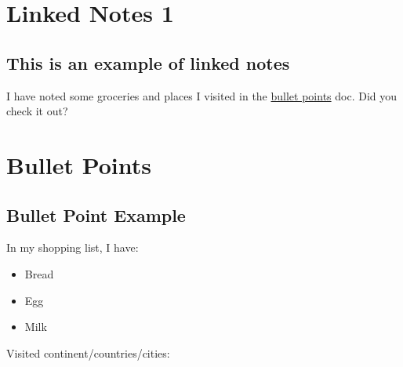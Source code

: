 \documentclass[10pt]{report}
\begin{document}
\tableofcontents


\chapter{Linked Notes 1}\label{ch:Linked Notes 1}

\section{This is an example of linked notes}


I have noted some groceries and places I visited in the \hyperref[ch:Bullet Points]{bullet points} doc. Did you check it out?
\chapter{Bullet Points}\label{ch:Bullet Points}

\section{Bullet Point Example}


In my shopping list, I have:

\begin{itemize}
\item Bread
\item Egg

\item Milk

\end{itemize}


Visited continent/countries/cities:
\end{document}

